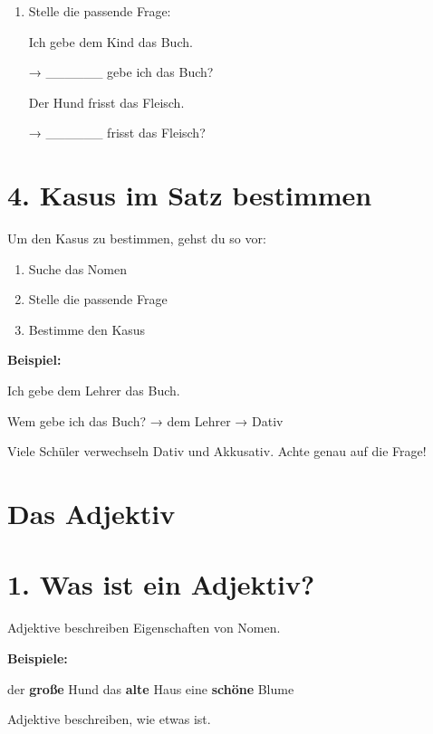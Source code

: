 \documentclass[a4paper,12pt]{article}
\begin{document}
\begin{enumerate}
\item Stelle die passende Frage:

Ich gebe dem Kind das Buch.

→ \_\_\_\_\_\_ gebe ich das Buch?

Der Hund frisst das Fleisch.

→ \_\_\_\_\_\_ frisst das Fleisch?
\end{enumerate}

\section*{4. Kasus im Satz bestimmen}

Um den Kasus zu bestimmen, gehst du so vor:

\begin{enumerate}
\item Suche das Nomen
\item Stelle die passende Frage
\item Bestimme den Kasus
\end{enumerate}

\textbf{Beispiel:}

Ich gebe dem Lehrer das Buch.

Wem gebe ich das Buch? → dem Lehrer → Dativ

\begin{achtung}
Viele Schüler verwechseln Dativ und Akkusativ.  
Achte genau auf die Frage!
\end{achtung}

\newpage

\section*{Das Adjektiv}

\section*{1. Was ist ein Adjektiv?}

Adjektive beschreiben Eigenschaften von Nomen.

\textbf{Beispiele:}

der \textbf{große} Hund  
das \textbf{alte} Haus  
eine \textbf{schöne} Blume  

\begin{merksatz}
Adjektive beschreiben, wie etwas ist.
\end{merksatz}
\end{document}
